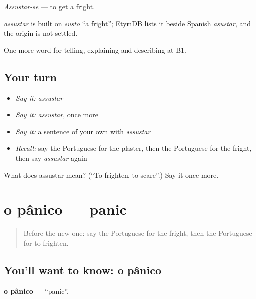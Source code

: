 \emph{Assustar-se} — to get a fright.

\begin{cousinweb}
\emph{assustar} is built on \emph{susto} \textquotedblleft{}a fright\textquotedblright{}; EtymDB lists it beside Spanish \emph{asustar}, and the origin is not settled.
\end{cousinweb}

\begin{grammarlens}[title={What you've built}]
One more word for telling, explaining and describing at B1.
\end{grammarlens}

\subsection*{Your turn}
\begin{itemize}
\raggedright
  \item \emph{Say it:} \emph{assustar}
  \item \emph{Say it:} \emph{assustar}, once more
  \item \emph{Say it:} a sentence of your own with \emph{assustar}
  \item \emph{Recall:} say the Portuguese for the plaster, then the Portuguese for the fright, then say \emph{assustar} again
\end{itemize}

\begin{tcolorbox}[breakable,colback=teal!4,colframe=teal!35!black,title={Before you move on}]
What does assustar mean? (\textquotedblleft{}To frighten, to scare\textquotedblright{}.) Say it once more.
\end{tcolorbox}
\section[o pânico]{o pânico — panic}

\label{lesson:PT-C308-panico}



\begin{quote}
Before the new one: say the Portuguese for the fright, then the Portuguese for to frighten.
\end{quote}

\subsection*{You'll want to know: o pânico}
\textbf{o pânico} — \textquotedblleft{}panic\textquotedblright{}.

